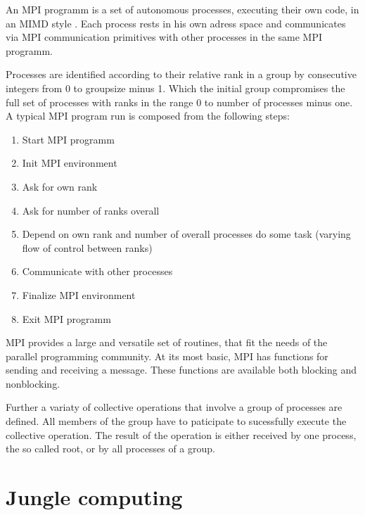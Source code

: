 An MPI programm is a set of autonomous processes, executing their own
code, in an MIMD style \cite{Flynn:1972:COE:1952456.1952459}. Each
process rests in his own adress space and communicates via MPI
communication primitives with other processes in the same MPI
programm.

Processes are identified according to their relative rank in a group
by consecutive integers from 0 to groupsize minus 1. Which the initial
group compromises the full set of processes with ranks in the range 0
to number of processes minus one. A typical MPI program run is composed from
the following steps:

\begin{enumerate}
\item Start MPI programm
\item Init MPI environment
\item Ask for own rank
\item Ask for number of ranks overall
\item Depend on own rank and number of overall processes do some task
  (varying flow of control between ranks)
\item Communicate with other processes
\item Finalize MPI environment
\item Exit MPI programm
\end{enumerate}

MPI provides a large and versatile set of routines, that fit the needs
of the parallel programming community. At its most basic, MPI has
functions for sending and receiving a message.  These functions are
available both blocking and nonblocking.

Further a variaty of collective operations that involve a group of
processes are defined. All members of the group have to paticipate to
sucessfully execute the collective operation.  The result of the
operation is either received by one process, the so called root, or by
all processes of a group.



\section{Jungle computing}

